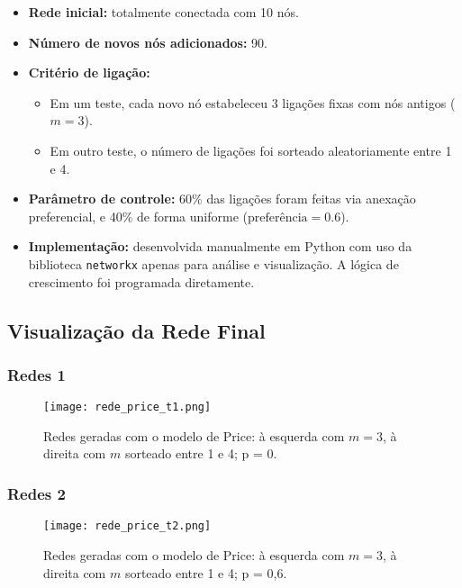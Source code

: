 \documentclass[a4paper]{article}
\begin{document}
\begin{itemize}
    \item \textbf{Rede inicial:} totalmente conectada com 10 nós.
    \item \textbf{Número de novos nós adicionados:} 90.
    \item \textbf{Critério de ligação:}
    \begin{itemize}
        \item Em um teste, cada novo nó estabeleceu 3 ligações fixas com nós antigos (\(m = 3\)).
        \item Em outro teste, o número de ligações foi sorteado aleatoriamente entre 1 e 4.
    \end{itemize}
    \item \textbf{Parâmetro de controle:} 60\% das ligações foram feitas via anexação preferencial, e 40\% de forma uniforme (\(\text{preferência} = 0.6\)).
    \item \textbf{Implementação:} desenvolvida manualmente em Python com uso da biblioteca \texttt{networkx} apenas para análise e visualização. A lógica de crescimento foi programada diretamente.
\end{itemize}

\subsection*{Visualização da Rede Final}

\subsubsection{Redes 1}
\begin{figure}[h]
\begin{center}
    \texttt{[image: rede\_price\_t1.png]}
\end{center}
\caption{Redes geradas com o modelo de Price: à esquerda com \(m = 3\), à direita com \(m\) sorteado entre 1 e 4; p = 0.}
\end{figure}

\subsubsection{Redes 2}
\begin{figure}[h]
\begin{center}
    \texttt{[image: rede\_price\_t2.png]}
\end{center}
\caption{Redes geradas com o modelo de Price: à esquerda com \(m = 3\), à direita com \(m\) sorteado entre 1 e 4; p = 0,6.}
\end{figure}
\end{document}
